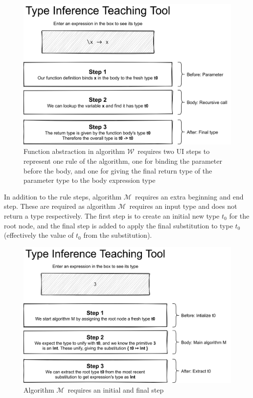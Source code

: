 \documentclass[a4paper,fleqn,oneside,12pt]{report}
\newcommand{\W}{$\mathcal{W}$}
\newcommand{\M}{$\mathcal{M}$}
\begin{document}
{\centering \begin{figure}[h!]
  \centering
  \includegraphics[width=0.9\linewidth]{images/image15.png}
  \caption{Function abstraction in algorithm \W\ requires two UI steps to represent one rule of the algorithm, one for binding the parameter before the body, and one for giving the final return type of the parameter type to the body expression type}
\end{figure} \par}

In addition to the rule steps, algorithm \M\ requires an extra beginning and end step. These are required as algorithm \M\ requires an input type and does not return a type respectively. The first step is to create an initial new type $t_0$ for the root node, and the final step is added to apply the final substitution to type $t_0$ (effectively the value of $t_0$ from the substitution).

{\centering \begin{figure}[h!]
  \centering
  \includegraphics[width=0.9\linewidth]{images/image10.png}
  \caption{Algorithm \M\ requires an initial and final step}
\end{figure} \par}
\end{document}
